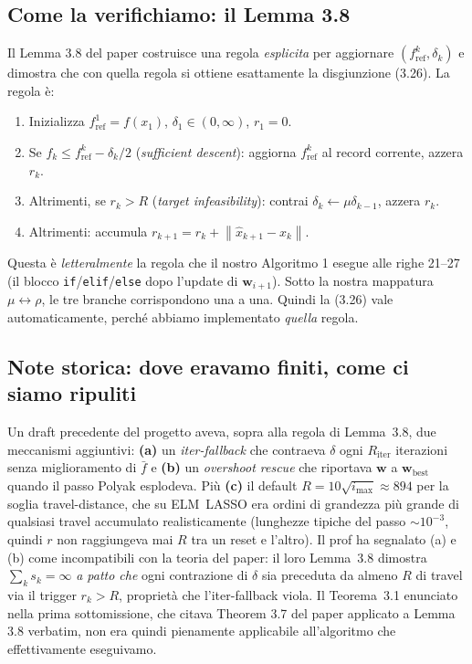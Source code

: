 \documentclass[11pt,a4paper]{article}
\newcommand{\norm}[1]{\left\|#1\right\|}
\newcommand{\bw}{\mathbf{w}}
\theoremstyle{definition}
\begin{document}
\subsection*{Come la verifichiamo: il Lemma 3.8}

Il Lemma 3.8 del paper costruisce una regola \emph{esplicita} per aggiornare $(f^k_{\mathrm{ref}}, \delta_k)$ e dimostra che con quella regola si ottiene esattamente la disgiunzione (3.26). La regola è:
\begin{enumerate}[leftmargin=*]
\item Inizializza $f^1_{\mathrm{ref}} = f(x_1)$, $\delta_1 \in (0,\infty)$, $r_1 = 0$.
\item Se $f_k \le f^k_{\mathrm{ref}} - \delta_k/2$ (\emph{sufficient descent}): aggiorna $f^k_{\mathrm{ref}}$ al record corrente, azzera $r_k$.
\item Altrimenti, se $r_k > R$ (\emph{target infeasibility}): contrai $\delta_k \gets \mu\delta_{k-1}$, azzera $r_k$.
\item Altrimenti: accumula $r_{k+1} = r_k + \norm{\hat x_{k+1} - x_k}$.
\end{enumerate}

Questa è \emph{letteralmente} la regola che il nostro Algoritmo 1 esegue alle righe 21--27 (il blocco \texttt{if}/\texttt{elif}/\texttt{else} dopo l'update di $\bw_{i+1}$). Sotto la nostra mappatura $\mu \leftrightarrow \rho$, le tre branche corrispondono una a una. Quindi la (3.26) vale automaticamente, perché abbiamo implementato \emph{quella} regola.

\subsection*{Note storica: dove eravamo finiti, come ci siamo ripuliti}

Un draft precedente del progetto aveva, sopra alla regola di Lemma~3.8, due meccanismi aggiuntivi: \textbf{(a)} un \emph{iter-fallback} che contraeva $\delta$ ogni $R_{\mathrm{iter}}$ iterazioni senza miglioramento di $\bar f$ e \textbf{(b)} un \emph{overshoot rescue} che riportava $\bw$ a $\bw_{\mathrm{best}}$ quando il passo Polyak esplodeva. Più \textbf{(c)} il default $R = 10\sqrt{i_{\max}} \approx 894$ per la soglia travel-distance, che su ELM~LASSO era ordini di grandezza più grande di qualsiasi travel accumulato realisticamente (lunghezze tipiche del passo $\sim 10^{-3}$, quindi $r$ non raggiungeva mai $R$ tra un reset e l'altro). Il prof ha segnalato (a) e (b) come incompatibili con la teoria del paper: il loro Lemma~3.8 dimostra $\sum_k s_k = \infty$ \emph{a patto che} ogni contrazione di $\delta$ sia preceduta da almeno $R$ di travel via il trigger $r_k > R$, proprietà che l'iter-fallback viola. Il Teorema~3.1 enunciato nella prima sottomissione, che citava Theorem 3.7 del paper applicato a Lemma 3.8 verbatim, non era quindi pienamente applicabile all'algoritmo che effettivamente eseguivamo.
\end{document}
